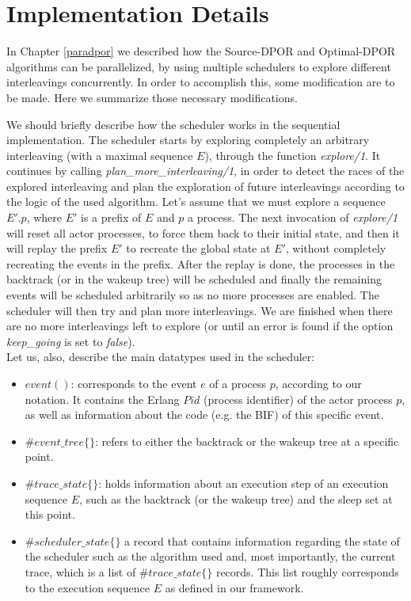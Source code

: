 \chapter{Implementation Details}
\label{conc_mods}

In Chapter \ref{paradpor} we described how the Source-DPOR and Optimal-DPOR algorithms can be parallelized, by using multiple schedulers
to explore different interleavings concurrently. In order to accomplish this, some modification are to be made.
Here we summarize those necessary modifications.

We should briefly describe how the scheduler works in the sequential implementation. The scheduler starts by exploring completely an arbitrary interleaving (with a maximal sequence $E$), 
through the function \textit{explore/1}.
It continues by calling \textit{plan\_more\_interleaving/1}, in order to detect the races of the explored interleaving and plan the exploration of 
future interleavings according to the logic of the used algorithm. Let's assume that we must explore a sequence $E'.p$, where $E'$ is a prefix
of $E$ and $p$ a process. The next invocation of \textit{explore/1} will reset all actor processes, to force them back to their initial state, and
then it will replay the prefix $E'$ to recreate the global state at $E'$, without completely recreating the events in the prefix. After the replay is done,
the processes in the backtrack (or in the wakeup tree) will be scheduled and finally the remaining events will be scheduled arbitrarily so as no
more processes are enabled. The scheduler will then try and plan more interleavings. We are finished when there are no more interleavings left to explore
(or until an error is found if the option \textit{keep\_going} is set to \textit{false}).
\\

\noindent Let us, also, describe the main datatypes used in the scheduler:
\begin{itemize} 
\item $event()$: corresponds to the event $e$ of a process $p$, according to our notation. It contains the
Erlang $Pid$ (process identifier) of the actor process $p$, as well as information about the code (e.g. the BIF) of this specific event.
\item $\#event\_tree\{\}$: refers to either the backtrack or the wakeup tree at a specific point.
\item $\#trace\_state\{\}$: holds information about an execution step of an execution sequence $E$, 
such as the backtrack (or the wakeup tree) and the sleep set at this point.
\item $\#scheduler\_state\{\}$ a record that contains information regarding the state of the scheduler
such as the algorithm used and, most importantly, the current trace, which is a list of $\#trace\_state\{\}$ records. This list
roughly corresponds to the execution sequence $E$ as defined in our framework.
\end{itemize}

